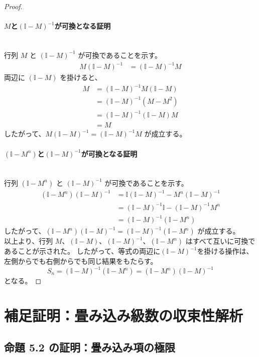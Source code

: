 \documentclass[dvipdfmx,a4paper,11pt]{jsarticle}
\begin{document}
\begin{proof}
\paragraph{$M$と$(\mathbb{I} - M)^{-1}$が可換となる証明}\ \\
行列 $M$ と $(\mathbb{I} - M)^{-1}$ が可換であることを示す。
\begin{align*}
    M(\mathbb{I} - M)^{-1} &= (\mathbb{I} - M)^{-1}M
\end{align*}
両辺に $(\mathbb{I} - M)$ を掛けると、
\begin{align*}
    M &= (\mathbb{I} - M)^{-1}M(\mathbb{I} - M) \\
    &= (\mathbb{I} - M)^{-1}(M - M^2) \\
    &= (\mathbb{I} - M)^{-1}(\mathbb{I} - M)M \\
    &= M
\end{align*}
したがって、$M(\mathbb{I} - M)^{-1} = (\mathbb{I} - M)^{-1}M$ が成立する。
\paragraph{$(\mathbb{I} - M^n)$と$(\mathbb{I} - M)^{-1}$が可換となる証明}\ \\
行列 $(\mathbb{I} - M^n)$ と $(\mathbb{I} - M)^{-1}$ が可換であることを示す。
\begin{align*}
    (\mathbb{I} - M^n)(\mathbb{I} - M)^{-1} &= \mathbb{I}(\mathbb{I}-M)^{-1} - M^n(\mathbb{I} - M)^{-1} \\
    &= (\mathbb{I} - M)^{-1}\mathbb{I} - (\mathbb{I} - M)^{-1}M^n\\
    &= (\mathbb{I} - M)^{-1}(\mathbb{I} - M^n)
\end{align*}
したがって、$(\mathbb{I} - M^n)(\mathbb{I} - M)^{-1} = (\mathbb{I} - M)^{-1}(\mathbb{I} - M^n)$ が成立する。 \\

\noindent
以上より、行列 $M$、$(\mathbb{I} - M)$、$(\mathbb{I} - M)^{-1}$、$(\mathbb{I} - M^n)$ はすべて互いに可換であることが示された。
したがって、等式の両辺に$(\mathbb{I} - M)^{-1}$を掛ける操作は、左側からでも右側からでも同じ結果をもたらす。
\[ S_n = (\mathbb{I} - M)^{-1}(\mathbb{I} - M^n) = (\mathbb{I} - M^n)(\mathbb{I} - M)^{-1} \] 
となる。
\end{proof}
\newpage
\section{補足証明：畳み込み級数の収束性解析}

\subsection{命題 5.2 の証明：畳み込み項の極限}\label{app:5.2}
\end{document}
